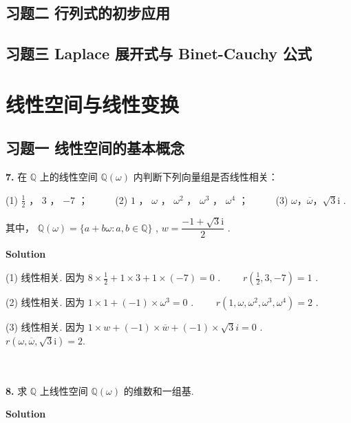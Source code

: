 \documentclass[11pt,a4paper,openany,oneside]{book}
\def\I{\mathrm{i}}
\newcommand\Solution{\noindent\textbf{\textsf{Solution}}\par\medskip}
\begin{document}
\section{习题二 \quad 行列式的初步应用}
\section{习题三 \quad Laplace 展开式与 Binet-Cauchy 公式}

\chapter{线性空间与线性变换}
\section{习题一 \quad 线性空间的基本概念}


\begin{myexample}
\textbf{7.} 
在  $ \mathbb{Q} $ 上的线性空间  $ \mathbb{Q}(\omega) $ 内判断下列向量组是否线性相关： 

(1)  $ \frac{1}{2} $ ， $ 3 $ ， $ -7 $ ；  \ \ \ \ \ (2)  $ 1 $ ， $ \omega $ ， $ \omega^2 $ ， $ \omega^3 $ ， $ \omega^4 $ ；  \ \ \ \ \ (3)  $ \omega$，$\overline{\omega}$，$\sqrt{3}\I $  . 

其中， $ \mathbb{Q} (\omega) = \{a+b\omega: a, b \in \mathbb{Q} \} $ ,  $ w = \dfrac{-1+\sqrt{3}\I}{2} $ . 
\end{myexample}
\Solution

(1) 线性相关. 因为 $ 8\times \frac{1}{2} + 1\times3 + 1\times(-7) = 0 $ . \ \ \ \  $ r(\tfrac{1}{2}, 3, -7) = 1 $ .

(2) 线性相关. 因为 $ 1\times1 + (-1)\times \omega^3 = 0 $  . \ \ \ \  $ r( 1, \omega, \omega^2, \omega^3, \omega^4)=2 $ . 

(3) 线性相关. 因为 $ 1\times w + (-1)\times \overline{w} + (-1)\times \sqrt{3}i = 0 $ . \ \ \ \  $ r(\omega, \overline{\omega}, \sqrt{3}\I) = 2. $   \\  \\  \\




\begin{myexample}
	\textbf{8.}
求 $ \mathbb{Q} $ 上线性空间 $ \mathbb{Q}(\omega) $ 的维数和一组基.  

\end{myexample}
\Solution
\end{document}
